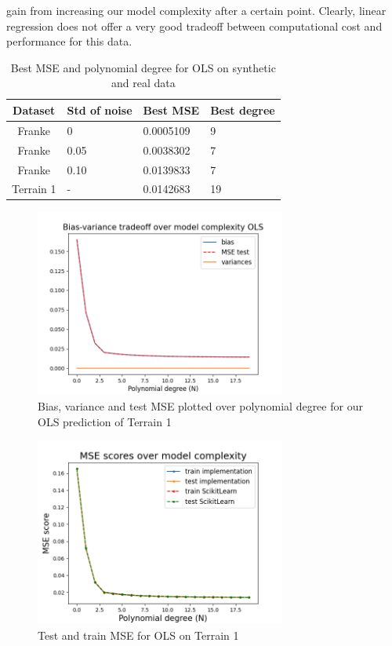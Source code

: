 \documentclass[twocolumn,10pt,cleanfoot]{asme2ej}
\begin{document}
gain from increasing our model complexity after a certain point. Clearly, linear regression does not offer a very good tradeoff between computational cost and performance for this data.

\begin{table}
\caption{Best MSE and polynomial degree for OLS on synthetic and real data}
\begin{center}
\label{ols_mse_table_dif_data}
\begin{tabular}{c l l l}
Dataset & Std of noise & Best MSE & Best degree \\
\hline
Franke & 0 & 0.0005109 & 9\\
Franke & 0.05 & 0.0038302 & 7 \\
Franke & 0.10 & 0.0139833 & 7 \\
Terrain 1 & - & 0.0142683 & 19 \\
\hline
\end{tabular}
\end{center}
\end{table}

\begin{figure}[h]
\centerline{\includegraphics[width=3.25in]{figure/realbiasvarianceOLS.png}}
\caption{Bias, variance and test MSE plotted over polynomial degree for our OLS prediction of Terrain 1}
\label{realbiasvarianceOLS}
\end{figure}



\begin{figure}[h]
\centerline{\includegraphics[width=3.25in]{figure/real1msetraintest.png}}
\caption{Test and train MSE for OLS on Terrain 1}
\label{real1msetraintest}
\end{figure}
\end{document}
